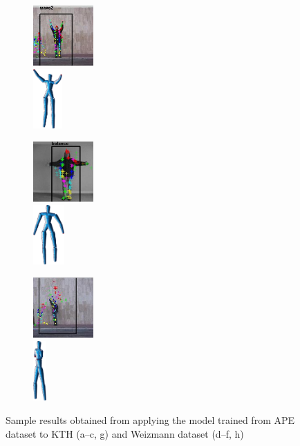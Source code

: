 \begin{figure}
\begin{subfigure}[t]{0.18\linewidth}
		\label{fig/body/others/e}
	\end{subfigure}
	\begin{subfigure}[t]{0.18\linewidth} \centering
		\includegraphics[height=2.3cm]{fig/body/others/weiz2.jpg} \\
		\includegraphics[height=2.3cm]{fig/body/others/weiz2.png} 
		\label{fig/body/others/f}
	\end{subfigure}
	\begin{subfigure}[t]{0.18\linewidth} \centering
		\includegraphics[height=2.3cm]{fig/body/others/ktherr.jpg} \\
		\includegraphics[height=2.3cm]{fig/body/others/ktherr.png} 
		\label{fig/body/others/g}
	\end{subfigure}
	\begin{subfigure}[t]{0.18\linewidth} \centering
		\includegraphics[height=2.3cm]{fig/body/others/weizerr.jpg} \\
		\includegraphics[height=2.3cm]{fig/body/others/weizerr.png} 
		\label{fig/body/others/h}
	\end{subfigure}
	\caption{Sample results obtained from applying the model trained from APE dataset to KTH (a--c, g) and Weizmann dataset (d--f, h)} 
	\label{fig/body/otherresults}
\end{figure}

